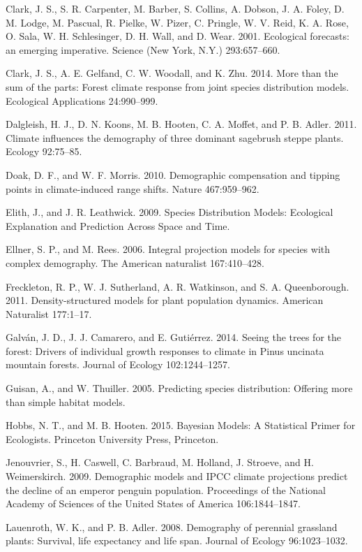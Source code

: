 \documentclass[12pt,]{article}
\begin{document}
Clark, J. S., S. R. Carpenter, M. Barber, S. Collins, A. Dobson, J. A.
Foley, D. M. Lodge, M. Pascual, R. Pielke, W. Pizer, C. Pringle, W. V.
Reid, K. A. Rose, O. Sala, W. H. Schlesinger, D. H. Wall, and D. Wear.
2001. Ecological forecasts: an emerging imperative. Science (New York,
N.Y.) 293:657--660.

Clark, J. S., A. E. Gelfand, C. W. Woodall, and K. Zhu. 2014. More than
the sum of the parts: Forest climate response from joint species
distribution models. Ecological Applications 24:990--999.

Dalgleish, H. J., D. N. Koons, M. B. Hooten, C. A. Moffet, and P. B.
Adler. 2011. Climate influences the demography of three dominant
sagebrush steppe plants. Ecology 92:75--85.

Doak, D. F., and W. F. Morris. 2010. Demographic compensation and
tipping points in climate-induced range shifts. Nature 467:959--962.

Elith, J., and J. R. Leathwick. 2009. Species Distribution Models:
Ecological Explanation and Prediction Across Space and Time.

Ellner, S. P., and M. Rees. 2006. Integral projection models for species
with complex demography. The American naturalist 167:410--428.

Freckleton, R. P., W. J. Sutherland, A. R. Watkinson, and S. A.
Queenborough. 2011. Density-structured models for plant population
dynamics. American Naturalist 177:1--17.

Galván, J. D., J. J. Camarero, and E. Gutiérrez. 2014. Seeing the trees
for the forest: Drivers of individual growth responses to climate in
Pinus uncinata mountain forests. Journal of Ecology 102:1244--1257.

Guisan, A., and W. Thuiller. 2005. Predicting species distribution:
Offering more than simple habitat models.

Hobbs, N. T., and M. B. Hooten. 2015. Bayesian Models: A Statistical
Primer for Ecologists. Princeton University Press, Princeton.

Jenouvrier, S., H. Caswell, C. Barbraud, M. Holland, J. Stroeve, and H.
Weimerskirch. 2009. Demographic models and IPCC climate projections
predict the decline of an emperor penguin population. Proceedings of the
National Academy of Sciences of the United States of America
106:1844--1847.

Lauenroth, W. K., and P. B. Adler. 2008. Demography of perennial
grassland plants: Survival, life expectancy and life span. Journal of
Ecology 96:1023--1032.
\end{document}
